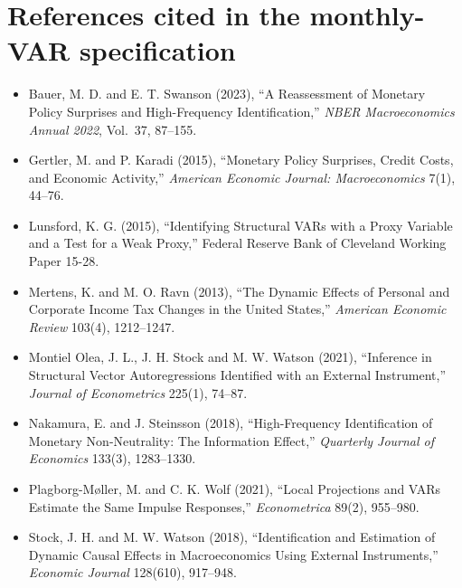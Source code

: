 \documentclass[11pt]{article}
\begin{document}
\section*{References cited in the monthly-VAR specification}
\small\begin{itemize}\itemsep0pt
\item Bauer, M. D. and E. T. Swanson (2023), ``A Reassessment of Monetary Policy Surprises and High-Frequency Identification,'' \emph{NBER Macroeconomics Annual 2022}, Vol.\ 37, 87--155.
\item Gertler, M. and P. Karadi (2015), ``Monetary Policy Surprises, Credit Costs, and Economic Activity,'' \emph{American Economic Journal: Macroeconomics} 7(1), 44--76.
\item Lunsford, K. G. (2015), ``Identifying Structural VARs with a Proxy Variable and a Test for a Weak Proxy,'' Federal Reserve Bank of Cleveland Working Paper 15-28.
\item Mertens, K. and M. O. Ravn (2013), ``The Dynamic Effects of Personal and Corporate Income Tax Changes in the United States,'' \emph{American Economic Review} 103(4), 1212--1247.
\item Montiel Olea, J. L., J. H. Stock and M. W. Watson (2021), ``Inference in Structural Vector Autoregressions Identified with an External Instrument,'' \emph{Journal of Econometrics} 225(1), 74--87.
\item Nakamura, E. and J. Steinsson (2018), ``High-Frequency Identification of Monetary Non-Neutrality: The Information Effect,'' \emph{Quarterly Journal of Economics} 133(3), 1283--1330.
\item Plagborg-M{\o}ller, M. and C. K. Wolf (2021), ``Local Projections and VARs Estimate the Same Impulse Responses,'' \emph{Econometrica} 89(2), 955--980.
\item Stock, J. H. and M. W. Watson (2018), ``Identification and Estimation of Dynamic Causal Effects in Macroeconomics Using External Instruments,'' \emph{Economic Journal} 128(610), 917--948.
\end{itemize}
\end{document}
